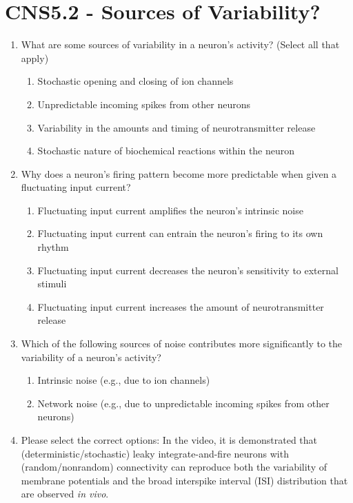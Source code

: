 \documentclass[11pt,letterpaper]{article}
\begin{document}
\maketitle
\thispagestyle{first}

\section{CNS5.2 - Sources of Variability?}
\begin{enumerate}
    \item What are some sources of variability in a neuron's activity? (Select all that apply)
    \begin{enumerate}
        \item Stochastic opening and closing of ion channels
        \item Unpredictable incoming spikes from other neurons
        \item Variability in the amounts and timing of neurotransmitter release
        \item Stochastic nature of biochemical reactions within the neuron
    \end{enumerate}
    
    \item Why does a neuron's firing pattern become more predictable when given a fluctuating input current?
    \begin{enumerate}
        \item Fluctuating input current amplifies the neuron's intrinsic noise
        \item Fluctuating input current can entrain the neuron's firing to its own rhythm
        \item Fluctuating input current decreases the neuron's sensitivity to external stimuli
        \item Fluctuating input current increases the amount of neurotransmitter release
    \end{enumerate}

    \item Which of the following sources of noise contributes more significantly to the variability of a neuron's activity?
    \begin{enumerate}
        \item Intrinsic noise (e.g., due to ion channels)
        \item Network noise (e.g., due to unpredictable incoming spikes from other neurons)
    \end{enumerate}
    
    \item Please select the correct options: In the video, it is demonstrated that (deterministic/stochastic) leaky integrate-and-fire neurons with (random/nonrandom) connectivity can reproduce both the variability of membrane potentials and the broad interspike interval (ISI) distribution that are observed \textit{in vivo}.
    
\end{enumerate}
\pagebreak
\end{document}
